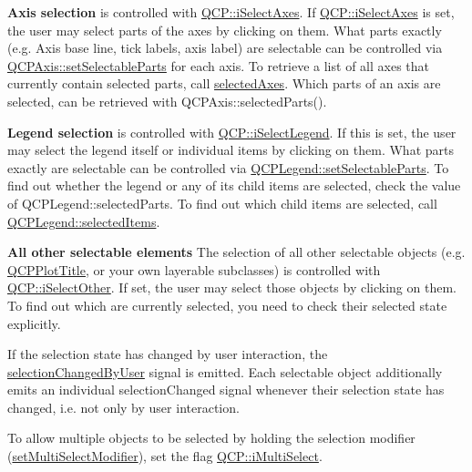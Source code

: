 {\bfseries Axis selection} is controlled with \hyperlink{namespace_q_c_p_a2ad6bb6281c7c2d593d4277b44c2b037ad6644ac55bef621645326e9dd7469caa}{Q\+C\+P\+::i\+Select\+Axes}. If \hyperlink{namespace_q_c_p_a2ad6bb6281c7c2d593d4277b44c2b037ad6644ac55bef621645326e9dd7469caa}{Q\+C\+P\+::i\+Select\+Axes} is set, the user may select parts of the axes by clicking on them. What parts exactly (e.\+g. Axis base line, tick labels, axis label) are selectable can be controlled via \hyperlink{class_q_c_p_axis_a513f9b9e326c505d9bec54880031b085}{Q\+C\+P\+Axis\+::set\+Selectable\+Parts} for each axis. To retrieve a list of all axes that currently contain selected parts, call \hyperlink{class_q_custom_plot_aa6baf867e8beb96ed5bd471f83ece903}{selected\+Axes}. Which parts of an axis are selected, can be retrieved with Q\+C\+P\+Axis\+::selected\+Parts().

{\bfseries Legend selection} is controlled with \hyperlink{namespace_q_c_p_a2ad6bb6281c7c2d593d4277b44c2b037a269c9af298e257d1108edec0432b5513}{Q\+C\+P\+::i\+Select\+Legend}. If this is set, the user may select the legend itself or individual items by clicking on them. What parts exactly are selectable can be controlled via \hyperlink{class_q_c_p_legend_a9ce60aa8bbd89f62ae4fa83ac6c60110}{Q\+C\+P\+Legend\+::set\+Selectable\+Parts}. To find out whether the legend or any of its child items are selected, check the value of Q\+C\+P\+Legend\+::selected\+Parts. To find out which child items are selected, call \hyperlink{class_q_c_p_legend_ac93eaf236e911d67aa8b88942ef45c5e}{Q\+C\+P\+Legend\+::selected\+Items}.

{\bfseries All other selectable elements} The selection of all other selectable objects (e.\+g. \hyperlink{class_q_c_p_plot_title}{Q\+C\+P\+Plot\+Title}, or your own layerable subclasses) is controlled with \hyperlink{namespace_q_c_p_a2ad6bb6281c7c2d593d4277b44c2b037af67a50bc26147a13b551b3a625374949}{Q\+C\+P\+::i\+Select\+Other}. If set, the user may select those objects by clicking on them. To find out which are currently selected, you need to check their selected state explicitly.

If the selection state has changed by user interaction, the \hyperlink{class_q_custom_plot_a500c64a109bc773c973ad274f2fa4190}{selection\+Changed\+By\+User} signal is emitted. Each selectable object additionally emits an individual selection\+Changed signal whenever their selection state has changed, i.\+e. not only by user interaction.

To allow multiple objects to be selected by holding the selection modifier (\hyperlink{class_q_custom_plot_a8fc96e3b5138a06759a2a90c166df516}{set\+Multi\+Select\+Modifier}), set the flag \hyperlink{namespace_q_c_p_a2ad6bb6281c7c2d593d4277b44c2b037aef673112c5067c3cf4cfddb62da7265d}{Q\+C\+P\+::i\+Multi\+Select}.

